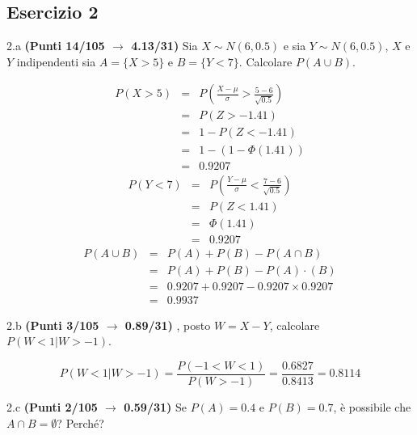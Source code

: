 \documentclass[
  11pt,
]{book}
\theoremstyle{mytheoremstyle}
\theoremstyle{mydefstyle}
\newenvironment{sol}
  {
  \begin{tcolorbox}[enhanced,breakable,arc=0.1mm,boxrule=1pt,colback=white,colframe=iblue,
  title=\bf \fontfamily{lmss}\selectfont \hspace{.5 cm} Soluzione,drop fuzzy shadow]

}{
\end{tcolorbox}
  }
\begin{document}
\subsection{Esercizio 2}\label{esercizio-2-39}

2.a \textbf{(Punti 14/105 \(\rightarrow\) 4.13/31)} Sia \(X\sim N(6,0.5)\) e sia \(Y\sim N(6,0.5)\), \(X\) e \(Y\) indipendenti sia \(A=\{X>5\}\) e \(B=\{Y<7\}\).
Calcolare \(P(A\cup B)\).

\begin{sol}
\begin{eqnarray*}
      P( X   >   5 ) 
        &=& P\left(  \frac { X  -  \mu }{ \sigma }  >  \frac { 5  -  6 }{\sqrt{ 0.5 }} \right)  \\
                 &=& P\left(  Z   >   -1.41 \right) \\    &=& 1-P(Z< -1.41 )\\ 
                 &=&  1-(1-\Phi( 1.41 )) \\ &=&  0.9207 
      \end{eqnarray*}\begin{eqnarray*}
      P( Y   <   7 ) 
        &=& P\left(  \frac { Y  -  \mu }{ \sigma }  <  \frac { 7  -  6 }{\sqrt{ 0.5 }} \right)  \\
                 &=& P\left(  Z   <   1.41 \right) \\    
                 &=&  \Phi( 1.41 ) \\ &=&  0.9207 
      \end{eqnarray*}\begin{eqnarray}
      P( A \cup B ) &=& P( A )+P( B )-P( A \cap B ) \\
                         &=& P( A )+P( B )-P( A )\cdot ( B ) \\
                         &=&  0.9207 + 0.9207 - 0.9207 \times 0.9207  \\
                         &=&  0.9937 \end{eqnarray}

\end{sol}

2.b \textbf{(Punti 3/105 \(\rightarrow\) 0.89/31)} , posto \(W=X-Y\), calcolare \(P(W<1|W>-1)\).

\begin{sol}
\[ 
P(W<1|W>-1)=\frac{P(-1<W<1)}{P(W>-1)}=\frac{0.6827}{0.8413}=0.8114
\]

\end{sol}

2.c \textbf{(Punti 2/105 \(\rightarrow\) 0.59/31)} Se \(P(A)=0.4\) e \(P(B)=0.7\), è possibile che \(A\cap B=\emptyset\)? Perché?
\end{document}
